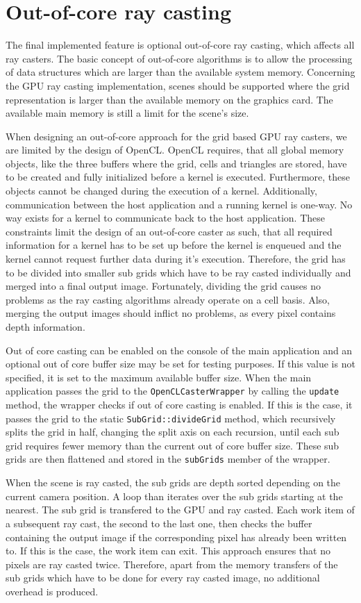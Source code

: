 \section{Out-of-core ray casting}
\label{sec:out_of_core}

The final implemented feature is optional out-of-core ray casting, which affects all ray casters. The basic concept of out-of-core algorithms is to allow the processing of data structures which are larger than the available system memory. Concerning the GPU ray casting implementation, scenes should be supported where the grid representation is larger than the available memory on the graphics card. The available main memory is still a limit for the scene's size.

When designing an out-of-core approach for the grid based GPU ray casters, we are limited by the design of OpenCL. OpenCL requires, that all global memory objects, like the three buffers where the grid, cells and triangles are stored, have to be created and fully initialized before a kernel is executed. Furthermore, these objects cannot be changed during the execution of a kernel. Additionally, communication between the host application and a running kernel is one-way. No way exists for a kernel to communicate back to the host application. These constraints limit the design of an out-of-core caster as such, that all required information for a kernel has to be set up before the kernel is enqueued and the kernel cannot request further data during it's execution. Therefore, the grid has to be divided into smaller sub grids which have to be ray casted individually and merged into a final output image. Fortunately, dividing the grid causes no problems as the ray casting algorithms already operate on a cell basis. Also, merging the output images should inflict no problems, as every pixel contains depth information.

Out of core casting can be enabled on the console of the main application and an optional out of core buffer size may be set for testing purposes. If this value is not specified, it is set to the maximum available buffer size. When the main application passes the grid to the \lstinline!OpenCLCasterWrapper! by calling the \lstinline!update! method, the wrapper checks if out of core casting is enabled. If this is the case, it passes the grid to the static \lstinline!SubGrid::divideGrid! method, which recursively splits the grid in half, changing the split axis on each recursion, until each sub grid requires fewer memory than the current out of core buffer size. These sub grids are then flattened and stored in the \lstinline!subGrids! member of the wrapper.

When the scene is ray casted, the sub grids are depth sorted depending on the current camera position. A loop than iterates over the sub grids starting at the nearest. The sub grid is transfered to the GPU and ray casted. Each work item of a subsequent ray cast, the second to the last one, then checks the buffer containing the output image if the corresponding pixel has already been written to. If this is the case, the work item can exit. This approach ensures that no pixels are ray casted twice. Therefore, apart from the memory transfers of the sub grids which have to be done for every ray casted image, no additional overhead is produced. 
